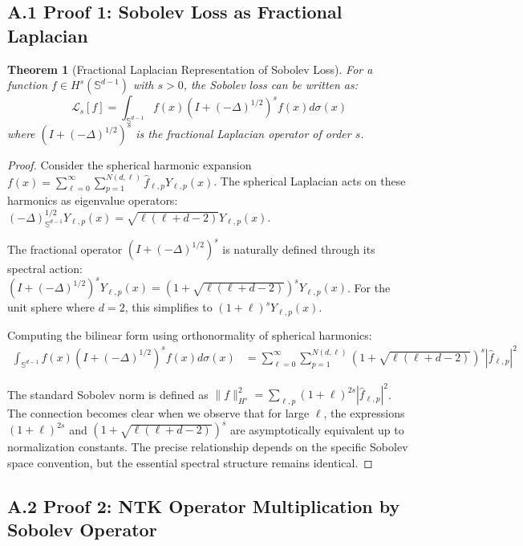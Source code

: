 \documentclass[a4paper]{article}
\theoremstyle{plain}
\newtheorem{theorem}{Theorem}[section]
\theoremstyle{definition}
\theoremstyle{remark}
\begin{document}
\subsection{A.1 Proof 1: Sobolev Loss as Fractional Laplacian}

\begin{theorem}[Fractional Laplacian Representation of Sobolev Loss]
For a function $f \in H^s(\mathbb{S}^{d-1})$ with $s > 0$, the Sobolev loss can be written as:
\[ \mathcal{L}_s[f] = \int_{\mathbb{S}^{d-1}} f(x) (I + (-\Delta)^{1/2})^s f(x) d\sigma(x) \]
where $(I + (-\Delta)^{1/2})^s$ is the fractional Laplacian operator of order $s$.
\end{theorem}

\begin{proof}
Consider the spherical harmonic expansion $f(x) = \sum_{\ell=0}^{\infty} \sum_{p=1}^{N(d,\ell)} \hat{f}_{\ell,p} Y_{\ell,p}(x)$. The spherical Laplacian acts on these harmonics as eigenvalue operators: $(-\Delta)^{1/2}_{\mathbb{S}^{d-1}} Y_{\ell,p}(x) = \sqrt{\ell(\ell + d - 2)} Y_{\ell,p}(x)$.

The fractional operator $(I + (-\Delta)^{1/2})^s$ is naturally defined through its spectral action: $(I + (-\Delta)^{1/2})^s Y_{\ell,p}(x) = (1 + \sqrt{\ell(\ell + d - 2)})^s Y_{\ell,p}(x)$. For the unit sphere where $d = 2$, this simplifies to $(1 + \ell)^s Y_{\ell,p}(x)$.

Computing the bilinear form using orthonormality of spherical harmonics:
\begin{align}
\int_{\mathbb{S}^{d-1}} f(x) (I + (-\Delta)^{1/2})^s f(x) d\sigma(x) &= \sum_{\ell=0}^{\infty} \sum_{p=1}^{N(d,\ell)} (1 + \sqrt{\ell(\ell + d - 2)})^s |\hat{f}_{\ell,p}|^2
\end{align}

The standard Sobolev norm is defined as $\|f\|_{H^s}^2 = \sum_{\ell,p} (1 + \ell)^{2s} |\hat{f}_{\ell,p}|^2$. The connection becomes clear when we observe that for large $\ell$, the expressions $(1 + \ell)^{2s}$ and $(1 + \sqrt{\ell(\ell + d - 2)})^s$ are asymptotically equivalent up to normalization constants. The precise relationship depends on the specific Sobolev space convention, but the essential spectral structure remains identical.
\end{proof}



\newpage
\subsection{A.2 Proof 2: NTK Operator Multiplication by Sobolev Operator}
\label{sec:appendix_composition}
\end{document}
